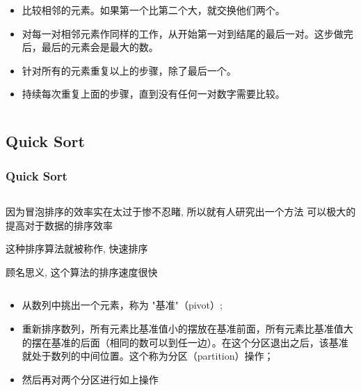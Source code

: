 \documentclass[en, 11pt, xcolor=dvipsnames]{beamer}
\begin{document}
\begin{frame}[fragile]


	\begin{columns}[c]
		\begin{column}{0.98\textwidth}

			\begin{itemize}
				\item 比较相邻的元素。如果第一个比第二个大，就交换他们两个。
				\item 对每一对相邻元素作同样的工作，从开始第一对到结尾的最后一对。这步做完后，最后的元素会是最大的数。
				\item 针对所有的元素重复以上的步骤，除了最后一个。
				\item 持续每次重复上面的步骤，直到没有任何一对数字需要比较。
			\end{itemize}


		\end{column}
	\end{columns}

\end{frame}

\subsection{Quick Sort}
\begin{frame}[fragile]
	\frametitle{Quick Sort}



	\begin{columns}[c]
		\begin{column}{0.98\textwidth}

			因为冒泡排序的效率实在太过于惨不忍睹, 所以就有人研究出一个方法
			可以极大的提高对于数据的排序效率

			这种排序算法就被称作, 快速排序

			顾名思义, 这个算法的排序速度很快

		\end{column}
	\end{columns}

\end{frame}

\begin{frame}[fragile]


	\begin{columns}[c]
		\begin{column}{0.98\textwidth}

			\begin{itemize}
				\item 从数列中挑出一个元素，称为 "基准"（pivot）;
				\item 重新排序数列，所有元素比基准值小的摆放在基准前面，所有元素比基准值大的摆在基准的后面（相同的数可以到任一边）。在这个分区退出之后，该基准就处于数列的中间位置。这个称为分区（partition）操作；
				\item 然后再对两个分区进行如上操作
			\end{itemize}

		\end{column}
	\end{columns}

\end{frame}
\end{document}
